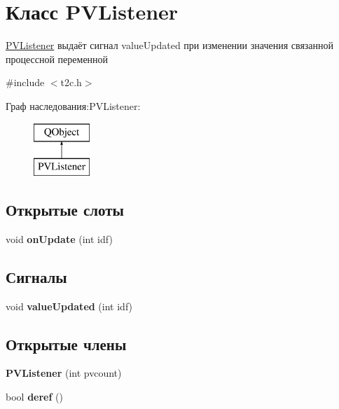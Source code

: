 \hypertarget{class_p_v_listener}{\section{Класс P\-V\-Listener}
\label{class_p_v_listener}
}


\hyperlink{class_p_v_listener}{P\-V\-Listener} выдаёт сигнал value\-Updated при изменении значения связанной процессной переменной  




{\ttfamily \#include $<$t2c.\-h$>$}

Граф наследования\-:P\-V\-Listener\-:\begin{figure}[H]
\begin{center}
\leavevmode
\includegraphics[height=2.000000cm]{class_p_v_listener}
\end{center}
\end{figure}
\subsection*{Открытые слоты}
\begin{DoxyCompactItemize}
\item 
\hypertarget{class_p_v_listener_abe135090bdd633ebceae1f45c092257e}{void {\bfseries on\-Update} (int idf)}\label{class_p_v_listener_abe135090bdd633ebceae1f45c092257e}

\end{DoxyCompactItemize}
\subsection*{Сигналы}
\begin{DoxyCompactItemize}
\item 
\hypertarget{class_p_v_listener_a35b4710a384a4fce528471c257a1bae6}{void {\bfseries value\-Updated} (int idf)}\label{class_p_v_listener_a35b4710a384a4fce528471c257a1bae6}

\end{DoxyCompactItemize}
\subsection*{Открытые члены}
\begin{DoxyCompactItemize}
\item 
\hypertarget{class_p_v_listener_ab9fd3bf9f09a8a47316c039d9244d96a}{{\bfseries P\-V\-Listener} (int pvcount)}\label{class_p_v_listener_ab9fd3bf9f09a8a47316c039d9244d96a}

\item 
\hypertarget{class_p_v_listener_a96dacdc1e1295bb889d64737fe8efa39}{bool {\bfseries deref} ()}\label{class_p_v_listener_a96dacdc1e1295bb889d64737fe8efa39}

\end{DoxyCompactItemize}



